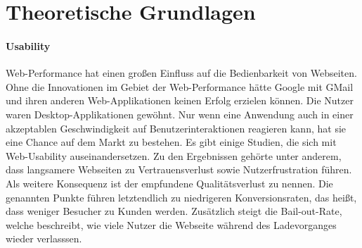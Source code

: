 \part{Theoretische Grundlagen}
\label{sec:theory}

\subsection{Usability}
Web-Performance hat einen großen Einfluss auf die Bedienbarkeit von Webseiten. Ohne die Innovationen im Gebiet der Web-Performance hätte Google mit GMail und ihren anderen Web-Applikationen keinen Erfolg erzielen können. Die Nutzer waren Desktop-Applikationen gew\"ohnt. Nur wenn eine Anwendung auch in einer akzeptablen Geschwindigkeit auf Benutzerinteraktionen reagieren kann, hat sie eine Chance auf dem Markt zu bestehen. Es gibt einige Studien, die sich mit Web-Usability auseinandersetzen. Zu den Ergebnissen gehörte unter anderem, dass langsamere Webseiten zu Vertrauensverlust sowie Nutzerfrustration führen. Als weitere Konsequenz ist der empfundene Qualitätsverlust zu nennen. Die genannten Punkte führen letztendlich zu niedrigeren Konversionsraten, das heißt, dass weniger Besucher zu Kunden werden. Zus\"atzlich steigt die Bail-out-Rate, welche beschreibt, wie viele Nutzer die Webseite w\"ahrend des Ladevorganges wieder verlasssen. 

